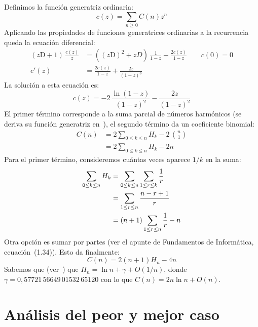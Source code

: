   Definimos la función generatriz ordinaria:
  \begin{equation*}
    c(z)
      = \sum_{n \ge 0} C(n) z^n
  \end{equation*}
  Aplicando las propiedades de funciones generatrices ordinarias
  a la recurrencia
  queda la ecuación diferencial:
  \begin{align*}
    \left( z \mathrm{D} + 1 \right) \, \frac{c(z)}{z}
      &= \left( (z \mathrm{D})^2 + z D \right) \, \frac{1}{1 - z}
           + \frac{2 c(z)}{1 - z}
           \qquad c(0) = 0 \\
    c'(z)
      &= \frac{2 c(z)}{1 - z} + \frac{2 z}{(1 - z)^3}
  \end{align*}
  La solución a esta ecuación es:
  \begin{equation*}
    c(z)
      = - 2 \, \frac{\ln (1 - z)}{(1 - z)^2}
            - \frac{2 z}{(1 - z)^2}
  \end{equation*}
  El primer término corresponde
  a la suma parcial de números harmónicos
  (se deriva su función generatriz
   en~\cite[capítulo 19]{brand17:_fundamentos_informatica}),
  el segundo término da un coeficiente binomial:
  \begin{align*}
    C(n)
      &= 2 \sum_{0 \le k \le n} H_k - 2 \, \binom{n}{1} \\
      &= 2 \sum_{0 \le k \le n} H_k - 2 n
  \end{align*}
  Para el primer término,
  consideremos cuántas veces aparece \(1/k\) en la suma:
  \begin{align}
    \sum_{0 \le k \le n} H_k
      &= \sum_{0 \le k \le n} \sum_{1 \le r \le k} \frac{1}{r} \notag \\
      &= \sum_{1 \le r \le n} \frac{n - r + 1}{r} \notag \\
      &= (n + 1) \sum_{1 \le r \le n} \frac{1}{r} - n
            \label{eq:Hn-sum}
  \end{align}
  Otra opción
  es sumar por partes
  (ver el apunte de Fundamentos de Informática,
   ecuación~(1.34)).
  Esto da finalmente:
  \begin{equation}
    \label{eq:quicksort-comparisons}
    C(n)
      = 2 (n + 1) H_n - 4 n
  \end{equation}
  Sabemos que
  (ver~\cite[capítulo 18]{brand17:_fundamentos_informatica})
  que \(H_n = \ln n + \gamma + O(1 / n)\),
  donde \(\gamma = 0,57721\,56649\,01532\,65120\)
  con lo que \(C(n) = 2 n \ln n + O(n)\).

\section{Análisis del peor y mejor caso}
\label{sec:peor-mejor-qsort}

